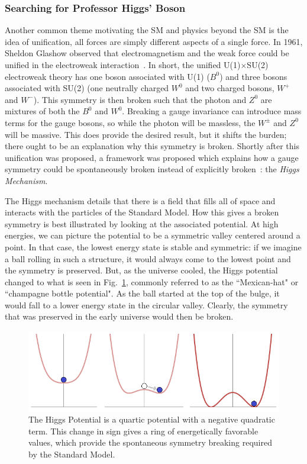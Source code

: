 \subsubsection{Searching for Professor Higgs' Boson}
\label{sec:findinghiggs}

Another common theme motivating the SM and physics beyond the SM is the idea of unification, all forces are simply different aspects of a single force. In 1961, Sheldon Glashow observed that electromagnetism and the weak force could be unified in the electroweak interaction~\cite{Glashow:1961}. In short, the unified U(1)$\times$SU(2) electroweak theory has one boson associated with U(1) ($B^{0}$) and three bosons associated with SU(2) (one neutrally charged $W^{0}$ and two charged bosons, $W^{+}$ and $W^{-}$). This symmetry is then broken such that the photon and $Z^{0}$ are mixtures of both the $B^{0}$ and $W^{0}$. Breaking a gauge invariance can introduce mass terms for the gauge bosons, so while the photon will be massless, the $W^{\pm}$ and $Z^{0}$ will be massive. This does provide the desired result, but it shifts the burden; there ought to be an explanation why this symmetry is broken. Shortly after this unification was proposed, a framework was proposed which explains how a gauge symmetry could be spontaneously broken instead of explicitly broken~\cite{Anderson:1963pc,Higgs:1964,Englert:1964,Higgs:1964-2,Guralnik:1964}: the \textit{Higgs Mechanism}. 

The Higgs mechanism details that there is a field that fills all of space and interacts with the particles of the Standard Model. How this gives a broken symmetry is best illustrated by looking at the associated potential. At high energies, we can picture the potential to be a symmetric valley centered around a point. In that case, the lowest energy state is stable and symmetric: if we imagine a ball rolling in such a structure, it would always come to the lowest point and the symmetry is preserved. But, as the universe cooled, the Higgs potential changed to what is seen in Fig.~\ref{fig:HiggsPotential}, commonly referred to as the ``Mexican-hat" or ``champagne bottle potential". As the ball started at the top of the bulge, it would fall to a lower energy state in the circular valley. Clearly, the symmetry that was preserved in the early universe would then be broken.

\begin{figure}[hbt]
\begin{center}
\includegraphics[width=.6\linewidth]{Introduction/figures/SpontaneousSymmetryBreaking.png}
\caption[The Higgs Mechanism - FROM WIKIPEDIA]{The Higgs Potential is a quartic potential with a negative quadratic term. This change in sign gives a ring of energetically favorable values, which provide the spontaneous symmetry breaking required by the Standard Model.}
\label{fig:HiggsPotential}
\end{center}
\end{figure}

